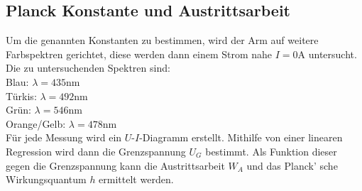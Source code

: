 \subsection{Planck Konstante und Austrittsarbeit}
Um die genannten Konstanten zu bestimmen, wird der Arm auf weitere Farbspektren 
gerichtet, diese werden dann einem Strom nahe $I = 0 \unit{\ampere}$ untersucht.
Die zu untersuchenden Spektren sind:
\vspace{0.5em}
\\
Blau: $\lambda = 435 \unit{\nano\meter}$
\vspace{0.5em}
\\
Türkis: $\lambda = 492 \unit{\nano\meter}$
\vspace{0.5em}
\\
Grün: $\lambda = 546 \unit{\nano\meter}$
\vspace{0.5em}
\\
Orange/Gelb: $\lambda = 478 \unit{\nano\meter}$
\vspace{0.5em}
\\
\noindent Für jede Messung wird ein $U$-$I$-Diagramm erstellt. Mithilfe von einer 
linearen Regression wird dann die Grenzspannung $U_G$ bestimmt. Als Funktion 
dieser gegen die Grenzspannung kann die Austrittsarbeit $W_A$ und das Planck'
sche Wirkungsquantum $h$ ermittelt werden.